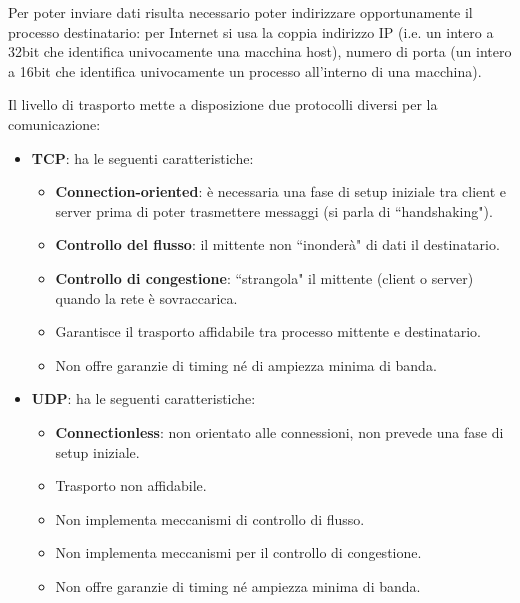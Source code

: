 \documentclass[11pt, italian, openany]{book}
\begin{document}
\begin{sloppypar}
Per poter inviare dati risulta necessario poter indirizzare opportunamente il processo destinatario: per Internet si usa la coppia indirizzo IP (i.e. un
intero a 32bit che identifica univocamente una macchina host), numero di porta (un intero a 16bit che identifica univocamente un processo all'interno di
una macchina).

Il livello di trasporto mette a disposizione due protocolli diversi per la comunicazione:
\begin{itemize}[topsep=0pt]
	\itemsep-0.3em
	\item \textbf{TCP}: ha le seguenti caratteristiche:
	\vspace{-3.5mm}
	\begin{itemize}
		\itemsep-0.3em
		\item \textbf{Connection-oriented}: \`e necessaria una fase di setup iniziale tra client e server prima di poter trasmettere messaggi (si parla
		di ``handshaking").
		\item \textbf{Controllo del flusso}: il mittente non ``inonder\`a" di dati il destinatario.
		\item \textbf{Controllo di congestione}: ``strangola" il mittente (client o server) quando la rete \`e sovraccarica.
		\item Garantisce il trasporto affidabile tra processo mittente e destinatario.
		\item Non offre garanzie di timing n\'e di ampiezza minima di banda.
	\end{itemize}
	\item \textbf{UDP}: ha le seguenti caratteristiche:
	\vspace{-3.5mm}
	\begin{itemize}
		\itemsep-0.3em
		\item \textbf{Connectionless}: non orientato alle connessioni, non prevede una fase di setup iniziale.
		\item Trasporto non affidabile.
		\item Non implementa meccanismi di controllo di flusso.
		\item Non implementa meccanismi per il controllo di congestione.
		\item Non offre garanzie di timing n\'e ampiezza minima di banda.
	\end{itemize}
\end{itemize}


\end{sloppypar}
\end{document}
